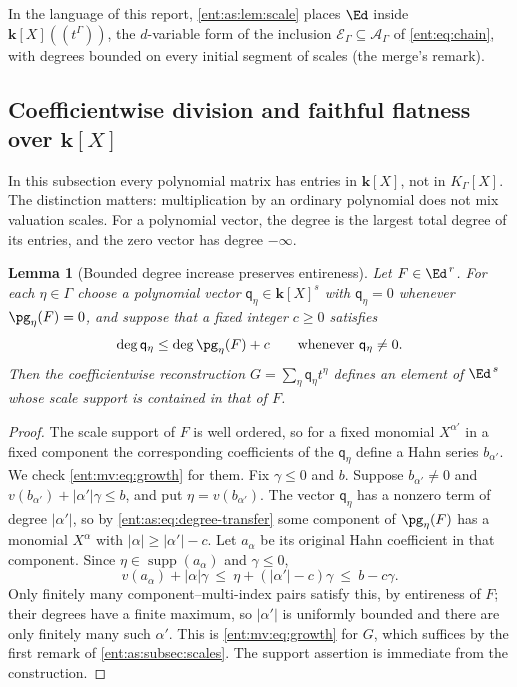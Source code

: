 \documentclass[11pt]{article}
\theoremstyle{plain}
\newtheorem{lemma}[lemma]{Lemma}
\theoremstyle{plain}
\theoremstyle{plain}
\theoremstyle{definition}
\theoremstyle{definition}
\theoremstyle{definition}
\theoremstyle{definition}
\theoremstyle{remark}
\newcommand{\K}{K_\Gamma}\newcommand{\KD}{K_\Delta}
\newcommand{\E}{\mathcal E_\Gamma}
\newcommand{\A}{\mathcal A_\Gamma}\newcommand{\OO}{\mathcal O_\Gamma}
\DeclareMathOperator{\supp}{supp}\DeclareMathOperator{\lc}{lc}
\newcommand{\kk}{\mathbf k}\newcommand{\PP}{\mathbb P}
\begin{document}
In the language of this report, \cref{ent:as:lem:scale} places $\Ed$ inside
$\kk[X]((t^\Gamma))$, the $d$-variable form of the inclusion $\E\subseteq\A$ of
\eqref{ent:eq:chain}, with degrees bounded on every initial segment of scales
(the merge's remark).

\subsection{Coefficientwise division and faithful flatness over
\texorpdfstring{$\kk[X]$}{k[X]}}
\label{ent:as:subsec:division}

In this subsection every polynomial matrix has entries in $\kk[X]$, not in
$\K[X]$. The distinction matters: multiplication by an ordinary polynomial
does not mix valuation scales. For a polynomial vector, the degree is the
largest total degree of its entries, and the zero vector has degree
$-\infty$.

\begin{lemma}[Bounded degree increase preserves entireness]
\label{ent:as:lem:degree-transfer}
Let $F\in\Ed^{\,r}$. For each $\eta\in\Gamma$ choose a polynomial vector
$\mathsf q_\eta\in\kk[X]^s$ with $\mathsf q_\eta=0$ whenever $\pg_\eta(F)=0$,
and suppose that a fixed integer $c\ge0$ satisfies
\begin{equation}\label{ent:as:eq:degree-transfer}
 \deg\mathsf q_\eta\le\deg\pg_\eta(F)+c
 \qquad\text{whenever }\mathsf q_\eta\ne0.
\end{equation}
Then the coefficientwise reconstruction $G=\sum_\eta\mathsf q_\eta t^\eta$
defines an element of $\Ed^{\,s}$ whose scale support is contained in that of
$F$.
\end{lemma}
\begin{proof}
The scale support of $F$ is well ordered, so for a fixed monomial
$X^{\alpha'}$ in a fixed component the corresponding coefficients of the
$\mathsf q_\eta$ define a Hahn series $b_{\alpha'}$. We check
\eqref{ent:mv:eq:growth} for them. Fix $\gamma\le0$ and $b$. Suppose
$b_{\alpha'}\ne0$ and $v(b_{\alpha'})+|\alpha'|\gamma\le b$, and put
$\eta=v(b_{\alpha'})$. The vector $\mathsf q_\eta$ has a nonzero term of degree
$|\alpha'|$, so by \eqref{ent:as:eq:degree-transfer} some component of
$\pg_\eta(F)$ has a monomial $X^\alpha$ with $|\alpha|\ge|\alpha'|-c$. Let
$a_\alpha$ be its original Hahn coefficient in that component. Since
$\eta\in\supp(a_\alpha)$ and $\gamma\le0$,
\[
 v(a_\alpha)+|\alpha|\gamma\ \le\ \eta+(|\alpha'|-c)\gamma\ \le\ b-c\gamma .
\]
Only finitely many component--multi-index pairs satisfy this, by entireness of
$F$; their degrees have a finite maximum, so $|\alpha'|$ is uniformly bounded
and there are only finitely many such $\alpha'$. This is
\eqref{ent:mv:eq:growth} for $G$, which suffices by the first remark of
\cref{ent:as:subsec:scales}. The support assertion is immediate from the
construction.
\end{proof}
\end{document}
